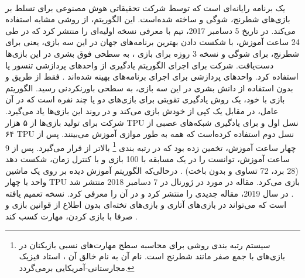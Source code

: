  

\paragraph{}
یک برنامه رایانه‌ای است که توسط شرکت تحقیقاتی هوش مصنوعی
 برای تسلط بر بازی‌های شطرنج، شوگی و 
ساخته شده‌است. این الگوریتم، از روشی مشابه
  استفاده می‌کند. در تاریخ 5 دسامبر 2017،  تیم
  با معرفی
   نسخه اولیه‌ای را منتشر کرد که در طی 24 ساعت آموزش، با شکست دادن بهترین برنامه‌های جهان در این سه بازی، یعنی
    برای شطرنج،
برای شوگی و نسخه 3 روزه
برای بازی 
،
به سطحی فوق بشری در این بازی‌ها دست‌یافت.  شرکت 
برای اجرای الگوریتم یادگیری
از واحدهای پردازشی تنسور
یا 
استفاده کرد. واحدهای پردازشی  برای اجرای برنامه‌های
بهینه شده‌اند
\cite{silver2017}.
  فقط از طریق 
و بدون استفاده از دانش بشری در این سه بازی، به سطحی باورنکردنی رسید. الگوریتم بازی با خود، یک روش یادگیری تقویتی برای بازی‌های دو یا چند نفره است که در آن عامل، در مقابل یک کپی از خودش بازی می‌کند و در روند این بازی‌ها یاد می‌گیرد.
شرکت
  برای تولید  بازی‌ها از ۵ هزار TPU نسل اول و برای یادگیری شبکه‌های عصبی از ۶۴ TPU نسل دوم استفاده کرده‌است که همه به طور موازی آموزش می‌بینند.
پس از چهار ساعت آموزش،
  تخمین زده بود که
    در رتبه بندی
\footnote{سیستم رتبه بندی
	  روشی برای محاسبه سطح مهارت‌های نسبی بازیکنان در بازی‌های با جمع صفر مانند شطرنج است. نام آن به نام خالق آن
،
استاد فیزیک مجارستانی-آمریکایی برمی‌گردد.}
بالاتر از
  قرار می‌گیرد. پس از 9 ساعت آموزش، توانست
را در یک مسابقه با 100 بازی و با کنترل زمان، شکست دهد (28 برد، 72 تساوی و بدون باخت) 
\cite{silver2017, knapton2017entire, superhuman2017}.
درحالی‌که الگوریتم آموزش دیده 
بر روی یک ماشین واحد با چهار TPU بازی می‌کرد.
مقاله
  در مورد
    در ژورنال
در 7 دسامبر 2018 منتشر شد
\cite{silver2018general}.
در سال 2019،
مقاله جدیدی را منتشر کرد و در آن
را معرفی کرد. 
نسخه تعمیم یافته 
است که می‌تواند در بازی‌های آتاری و بازی‌های تخته‌ای
 بدون اطلاع از قوانین بازی و صرفا با بازی کردن، مهارت کسب کند
 \cite{berner2019dota}.



